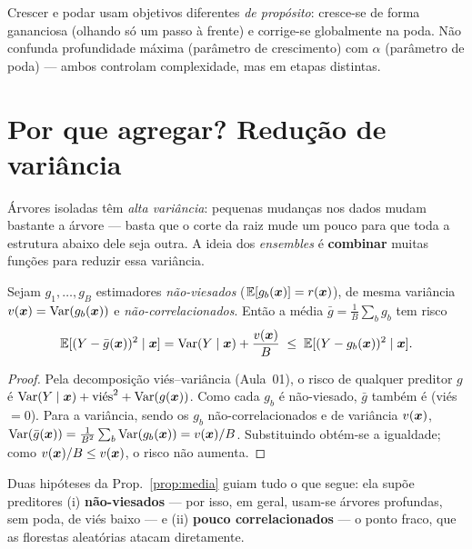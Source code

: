 \documentclass[11pt,a4paper]{article}
\begin{document}
\begin{atencao}
Crescer e podar usam objetivos diferentes \emph{de propósito}: cresce-se de forma
gananciosa (olhando só um passo à frente) e corrige-se globalmente na poda. Não
confunda profundidade máxima (parâmetro de crescimento) com $\alpha$ (parâmetro de
poda) --- ambos controlam complexidade, mas em etapas distintas.
\end{atencao}

\section{Por que agregar? Redução de variância}
Árvores isoladas têm \emph{alta variância}: pequenas mudanças nos dados mudam
bastante a árvore --- basta que o corte da raiz mude um pouco para que toda a
estrutura abaixo dele seja outra. A ideia dos \emph{ensembles} é \textbf{combinar}
muitas funções para reduzir essa variância.

\begin{proposicao}\label{prop:media}
Sejam $g_1,\dots,g_B$ estimadores \emph{não-viesados}
($\mathbb{E}[g_b(\bm{x})]=r(\bm{x})$), de mesma variância $v(\bm{x})=\operatorname{Var}(g_b(\bm{x}))$ e
\emph{não-correlacionados}. Então a média $\bar g=\frac1B\sum_b g_b$ tem risco
\[
  \mathbb{E}[(Y-\bar g(\bm{x}))^2\mid\bm{x}] = \operatorname{Var}(Y\mid\bm{x}) + \frac{v(\bm{x})}{B}
  \;\le\; \mathbb{E}[(Y-g_b(\bm{x}))^2\mid\bm{x}].
\]
\end{proposicao}
\begin{proof}
Pela decomposição viés--variância (Aula~01), o risco de qualquer preditor $g$ é
$\operatorname{Var}(Y\mid\bm{x})+\text{viés}^2+\operatorname{Var}(g(\bm{x}))$. Como cada $g_b$ é não-viesado, $\bar
g$ também é (viés $=0$). Para a variância, sendo os $g_b$ não-correlacionados e de
variância $v(\bm{x})$,
$\operatorname{Var}(\bar g(\bm{x}))=\frac1{B^2}\sum_b \operatorname{Var}(g_b(\bm{x}))=v(\bm{x})/B$. Substituindo obtém-se a
igualdade; como $v(\bm{x})/B\le v(\bm{x})$, o risco não aumenta.
\end{proof}

\begin{ideia}
Duas hipóteses da Prop.~\ref{prop:media} guiam tudo o que segue: ela supõe
preditores (i) \textbf{não-viesados} --- por isso, em geral, usam-se árvores
profundas, sem poda, de viés baixo --- e (ii) \textbf{pouco correlacionados} --- o
ponto fraco, que as florestas aleatórias atacam diretamente.
\end{ideia}
\end{document}
